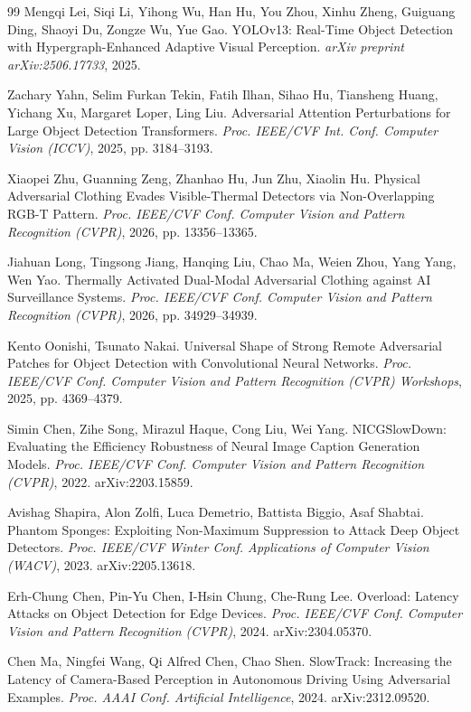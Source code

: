 \documentclass[a4paper,fleqn]{cas-dc}
\begin{document}
\begin{thebibliography}{99}
 Mengqi Lei, Siqi Li, Yihong Wu, Han Hu, You Zhou, Xinhu Zheng, Guiguang Ding, Shaoyi Du, Zongze Wu, Yue Gao. YOLOv13: Real-Time Object Detection with Hypergraph-Enhanced Adaptive Visual Perception. \emph{arXiv preprint arXiv:2506.17733}, 2025.

 Zachary Yahn, Selim Furkan Tekin, Fatih Ilhan, Sihao Hu, Tiansheng Huang, Yichang Xu, Margaret Loper, Ling Liu. Adversarial Attention Perturbations for Large Object Detection Transformers. \emph{Proc. IEEE/CVF Int. Conf. Computer Vision (ICCV)}, 2025, pp. 3184--3193.

 Xiaopei Zhu, Guanning Zeng, Zhanhao Hu, Jun Zhu, Xiaolin Hu. Physical Adversarial Clothing Evades Visible-Thermal Detectors via Non-Overlapping RGB-T Pattern. \emph{Proc. IEEE/CVF Conf. Computer Vision and Pattern Recognition (CVPR)}, 2026, pp. 13356--13365.

 Jiahuan Long, Tingsong Jiang, Hanqing Liu, Chao Ma, Weien Zhou, Yang Yang, Wen Yao. Thermally Activated Dual-Modal Adversarial Clothing against AI Surveillance Systems. \emph{Proc. IEEE/CVF Conf. Computer Vision and Pattern Recognition (CVPR)}, 2026, pp. 34929--34939.

 Kento Oonishi, Tsunato Nakai. Universal Shape of Strong Remote Adversarial Patches for Object Detection with Convolutional Neural Networks. \emph{Proc. IEEE/CVF Conf. Computer Vision and Pattern Recognition (CVPR) Workshops}, 2025, pp. 4369--4379.


 Simin Chen, Zihe Song, Mirazul Haque, Cong Liu, Wei Yang. NICGSlowDown: Evaluating the Efficiency Robustness of Neural Image Caption Generation Models. \emph{Proc. IEEE/CVF Conf. Computer Vision and Pattern Recognition (CVPR)}, 2022. arXiv:2203.15859.

 Avishag Shapira, Alon Zolfi, Luca Demetrio, Battista Biggio, Asaf Shabtai. Phantom Sponges: Exploiting Non-Maximum Suppression to Attack Deep Object Detectors. \emph{Proc. IEEE/CVF Winter Conf. Applications of Computer Vision (WACV)}, 2023. arXiv:2205.13618.

 Erh-Chung Chen, Pin-Yu Chen, I-Hsin Chung, Che-Rung Lee. Overload: Latency Attacks on Object Detection for Edge Devices. \emph{Proc. IEEE/CVF Conf. Computer Vision and Pattern Recognition (CVPR)}, 2024. arXiv:2304.05370.

 Chen Ma, Ningfei Wang, Qi Alfred Chen, Chao Shen. SlowTrack: Increasing the Latency of Camera-Based Perception in Autonomous Driving Using Adversarial Examples. \emph{Proc. AAAI Conf. Artificial Intelligence}, 2024. arXiv:2312.09520.

\end{thebibliography}
\end{document}
